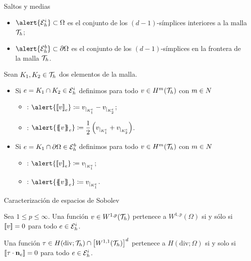 \begin{frame}{Saltos y medias}
\begin{itemize}
	\item $\alert{\E_h^i}\subset\Omega$ es el conjunto de los $(d-1)$-símplices interiores a la malla $\mathcal{T}_h$;
	\item $\alert{\E_h^b}\subset\partial\Omega$ es el conjunto de los $(d-1)$-símplices en la frontera de la malla $\mathcal{T}_h$.
\end{itemize}

\begin{definicion}
	Sean $K_1,K_2\in\mathcal{T}_h$ dos elementos de la malla.
	
	\begin{itemize}
		\item Si $e=K_1\cap K_2\in \mathcal{E}_h^i$ definimos para todo $v\in H^m(\mathcal{T}_h)$ con $m\in\relax N$
		
		\begin{itemize}\itemsep1em
			\item {}: $\alert{\salto{v}_e}\coloneqq v_{|_{K_1^e}}-v_{|_{K_{2}^e}}$;
			\item {}: $\alert{\media{v}_e}\coloneqq \dfrac{1}{2}\left(v_{|_{K_1^e}}+v_{|_{K_{2}^e}}\right) $.
		\end{itemize}
		
		\item Si $e=K_1\cap \partial\Omega\in \mathcal{E}_h^b$ definimos para todo $v\in H^m(\mathcal{T}_h)$ con $m\in\relax N$
		
		\begin{itemize}\itemsep1em
			\item {}: $\alert{\salto{v}_e}\coloneqq v_{|_{K_1^e}}$;
			\item {}: $\alert{\media{v}_e}\coloneqq v_{|_{K_1^e}}$.
		\end{itemize}
		
	\end{itemize}
	
\end{definicion}
\end{frame}

\begin{frame}{Caracterización de espacios de Sobolev}

\begin{lemma}
	\label{lemma:caracterizacion_sobolev}
	Sea $1\leq p\leq \infty$. Una función $v\in W^{1,p}(\mathcal{T}_h)$ pertenece a $W^{1,p}(\Omega)$ si y sólo si $\left[\!\left[v\right]\!\right]=0$ para todo $e\in\mathcal{E}_h^i$.
\end{lemma}

\begin{lemma}
	Una función $\tau\in H(\text{div};\mathcal{T}_h)\cap \left[W^{1,1}(\mathcal{T}_h)\right]^d$ pertenece a $H(\text{div};\Omega)$ si y solo si $\left[\!\left[\tau\cdot\mathbf{n}_e\right]\!\right]=0$ para todo $e\in\mathcal{E}_h^i$.
\end{lemma}

\end{frame}

